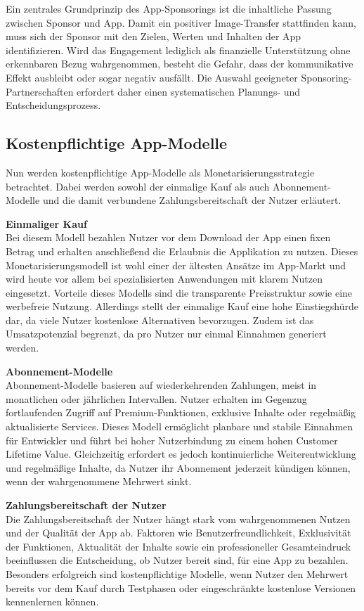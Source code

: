 Ein zentrales Grundprinzip des App-Sponsorings ist die inhaltliche Passung zwischen Sponsor und App. Damit ein positiver Image-Transfer stattfinden kann, muss sich der Sponsor mit den Zielen, Werten und Inhalten der App identifizieren. Wird das Engagement lediglich als finanzielle Unterstützung ohne erkennbaren Bezug wahrgenommen, besteht die Gefahr, dass der kommunikative Effekt ausbleibt oder sogar negativ ausfällt. Die Auswahl geeigneter Sponsoring-Partnerschaften erfordert daher einen systematischen Planungs- und Entscheidungsprozess.\cite{sponsoring}


\subsection{Kostenpflichtige App-Modelle}
Nun werden kostenpflichtige App-Modelle als Monetarisierungsstrategie betrachtet. Dabei werden sowohl der einmalige Kauf als auch Abonnement-Modelle und die damit verbundene Zahlungsbereitschaft der Nutzer erläutert.

\textbf{Einmaliger Kauf}\\
Bei diesem Modell bezahlen Nutzer vor dem Download der App einen fixen Betrag und erhalten anschließend die Erlaubnis die Applikation zu nutzen. Dieses Monetarisierungsmodell ist wohl einer der ältesten Ansätze im App-Markt und wird heute vor allem bei spezialisierten Anwendungen mit klarem Nutzen eingesetzt. Vorteile dieses Modells sind die transparente Preisstruktur sowie eine werbefreie Nutzung. Allerdings stellt der einmalige Kauf eine hohe Einstiegshürde dar, da viele Nutzer kostenlose Alternativen bevorzugen. Zudem ist das Umsatzpotenzial begrenzt, da pro Nutzer nur einmal Einnahmen generiert werden.\cite{Kostenpflichtige_Ideen}

\textbf{Abonnement-Modelle}\\
Abonnement-Modelle basieren auf wiederkehrenden Zahlungen, meist in monatlichen oder jährlichen Intervallen. Nutzer erhalten im Gegenzug fortlaufenden Zugriff auf Premium-Funktionen, exklusive Inhalte oder regelmäßig aktualisierte Services. Dieses Modell ermöglicht planbare und stabile Einnahmen für Entwickler und führt bei hoher Nutzerbindung zu einem hohen Customer Lifetime Value. Gleichzeitig erfordert es jedoch kontinuierliche Weiterentwicklung und regelmäßige Inhalte, da Nutzer ihr Abonnement jederzeit kündigen können, wenn der wahrgenommene Mehrwert sinkt.\cite{Kostenpflichtige_Ideen}

\textbf{Zahlungsbereitschaft der Nutzer}\\
Die Zahlungsbereitschaft der Nutzer hängt stark vom wahrgenommenen Nutzen und der Qualität der App ab. Faktoren wie Benutzerfreundlichkeit, Exklusivität der Funktionen, Aktualität der Inhalte sowie ein professioneller Gesamteindruck beeinflussen die Entscheidung, ob Nutzer bereit sind, für eine App zu bezahlen. Besonders erfolgreich sind kostenpflichtige Modelle, wenn Nutzer den Mehrwert bereits vor dem Kauf durch Testphasen oder eingeschränkte kostenlose Versionen kennenlernen können.\cite{Kostenpflichtige_Ideen}

